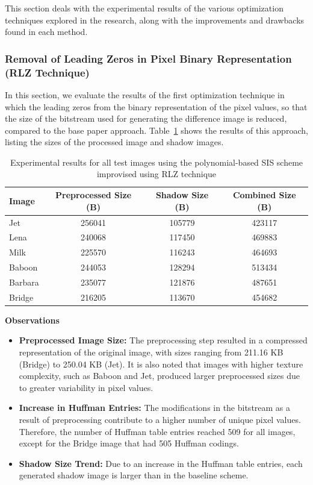 This section deals with the experimental results of the various optimization techniques explored in the research, along with the improvements and drawbacks found in each method.
 
\subsubsection{Removal of Leading Zeros in Pixel Binary Representation (RLZ Technique)}
 
In this section, we evaluate the results of the first optimization technique in which the leading zeros from the binary representation of the pixel values, so that the size of the bitstream used for generating the difference image is reduced, compared to the base paper approach. Table~\ref{tab:rlz} shows the results of this approach, listing the sizes of the processed image and shadow images.
 
\begin{table}[H]
\centering
\small
\setlength{\tabcolsep}{4pt}
\caption{Experimental results for all test images using the polynomial-based SIS scheme improvised using RLZ technique}
\label{tab:rlz}
\begin{tabular}{lccc}
\toprule
Image & Preprocessed Size (B) & Shadow Size (B) & Combined Size (B) \\
\midrule
Jet     & 256041 & 105779 & 423117 \\
Lena    & 240068 & 117450 & 469883 \\
Milk    & 225570 & 116243 & 464693 \\
Baboon  & 244053 & 128294 & 513434 \\
Barbara & 235077 & 121876 & 487651 \\
Bridge  & 216205 & 113670 & 454682 \\
\bottomrule
\end{tabular}
\end{table}
 
\textbf{Observations}
\begin{itemize}
    \item \textbf{Preprocessed Image Size:} The preprocessing step resulted in a compressed representation of the original image, with sizes ranging from 211.16 KB (Bridge) to 250.04 KB (Jet). It is also noted that images with higher texture complexity, such as Baboon and Jet, produced larger preprocessed sizes due to greater variability in pixel values.
    \item \textbf{Increase in Huffman Entries:} The modifications in the bitstream as a result of preprocessing contribute to a higher number of unique pixel values. Therefore, the number of Huffman table entries reached 509 for all images, except for the Bridge image that had 505 Huffman codings.
    \item \textbf{Shadow Size Trend:} Due to an increase in the Huffman table entries, each generated shadow image is larger than in the baseline scheme.
\end{itemize}
 
